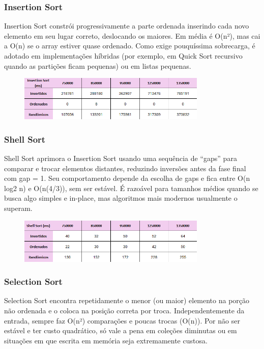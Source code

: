 \documentclass[a4paper, 12pt]{article}
\begin{document}
        \subsubsection{Insertion Sort}
            Insertion Sort constrói progressivamente a parte ordenada inserindo cada novo elemento em seu lugar correto, deslocando os maiores. Em média é O(n²), mas cai a O(n) se o array estiver quase ordenado. Como exige pouquíssima sobrecarga, é adotado em implementações híbridas (por exemplo, em Quick Sort recursivo quando as partições ficam pequenas) ou em listas pequenas.

            \begin{figure}[ht]
                \centering
                \includegraphics[width=0.8\textwidth]{images/insertion.png}
            \end{figure}

        \subsubsection{Shell Sort}
            Shell Sort aprimora o Insertion Sort usando uma sequência de “gaps” para comparar e trocar elementos distantes, reduzindo inversões antes da fase final com gap = 1. Seu comportamento depende da escolha de gaps e fica entre O(n log2 n) e O(n(4/3)), sem ser estável. É razoável para tamanhos médios quando se busca algo simples e in-place, mas algoritmos mais modernos usualmente o superam.

            \begin{figure}[ht]
                \centering
                \includegraphics[width=0.8\textwidth]{images/shell.png}
            \end{figure}

        \subsubsection{Selection Sort}
            Selection Sort encontra repetidamente o menor (ou maior) elemento na porção não ordenada e o coloca na posição correta por troca. Independentemente da entrada, sempre faz O(n²) comparações e poucas trocas (O(n)). Por não ser estável e ter custo quadrático, só vale a pena em coleções diminutas ou em situações em que escrita em memória seja extremamente custosa.
\end{document}
